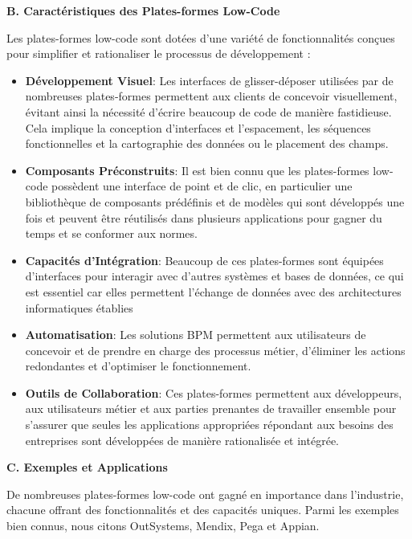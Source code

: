 \textbf{B. Caractéristiques des Plates-formes Low-Code}

Les plates-formes low-code sont dotées d'une variété de fonctionnalités conçues pour simplifier et rationaliser le processus de développement :

\begin{itemize}
    \item \textbf{Développement Visuel}: Les interfaces de glisser-déposer utilisées par de nombreuses plates-formes permettent aux clients de concevoir visuellement, évitant ainsi la nécessité d'écrire beaucoup de code de manière fastidieuse. Cela implique la conception d'interfaces et l'espacement, les séquences fonctionnelles et la cartographie des données ou le placement des champs.

    \item \textbf{Composants Préconstruits}: Il est bien connu que les plates-formes low-code possèdent une interface de point et de clic, en particulier une bibliothèque de composants prédéfinis et de modèles qui sont développés une fois et peuvent être réutilisés dans plusieurs applications pour gagner du temps et se conformer aux normes.

    \item \textbf{Capacités d'Intégration}: Beaucoup de ces plates-formes sont équipées d'interfaces pour interagir avec d'autres systèmes et bases de données, ce qui est essentiel car elles permettent l'échange de données avec des architectures informatiques établies

    \item \textbf{Automatisation}: Les solutions BPM permettent aux utilisateurs de concevoir et de prendre en charge des processus métier, d'éliminer les actions redondantes et d'optimiser le fonctionnement.

    \item \textbf{Outils de Collaboration}: Ces plates-formes permettent aux développeurs, aux utilisateurs métier et aux parties prenantes de travailler ensemble pour s'assurer que seules les applications appropriées répondant aux besoins des entreprises sont développées de manière rationalisée et intégrée.

\end{itemize}

\textbf{C. Exemples et Applications }

De nombreuses plates-formes low-code ont gagné en importance dans l'industrie, chacune offrant des fonctionnalités et des capacités uniques. Parmi les exemples bien connus, nous citons OutSystems, Mendix, Pega et Appian.



